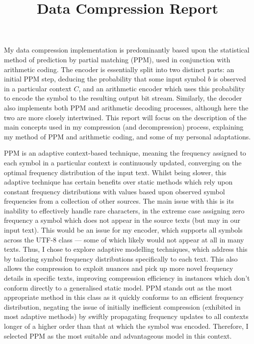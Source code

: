 \documentclass[a4paper, 11pt]{article}
\title{Data Compression Report}
\author{}
\date{}
\begin{document}
\maketitle

My data compression implementation is predominantly based upon the statistical method of prediction by partial matching (PPM), used in conjunction with arithmetic coding. The encoder is essentially split into two distinct parts: an initial PPM step, deducing the probability that some input symbol $b$ is observed in a particular context $C$, and an arithmetic encoder which uses this probability to encode the symbol to the resulting output bit stream. Similarly, the decoder also implements both PPM and arithmetic decoding processes, although here the two are more closely intertwined. This report will focus on the description of the main concepts used in my compression (and decompression) process, explaining my method of PPM and arithmetic coding, and some of my personal adaptations.

PPM is an adaptive context-based technique, meaning the frequency assigned to each symbol in a particular context is continuously updated, converging on the optimal frequency distribution of the input text. Whilst being slower, this adaptive technique has certain benefits over static methods which rely upon constant frequency distributions with values based upon observed symbol frequencies from a collection of other sources. The main issue with this is its inability to effectively handle rare characters, in the extreme case assigning zero frequency a symbol which does not appear in the source texts (but may in our input text). This would be an issue for my encoder, which supports all symbols across the UTF-8 class --- some of which likely would not appear at all in many texts. Thus, I chose to explore adaptive modelling techniques, which address this by tailoring symbol frequency distributions specifically to each text. This also allows the compression to exploit nuances and pick up more novel frequency details in specific texts, improving  compression efficiency in instances which don't conform directly to a generalised static model. PPM stands out as the most appropriate method in this class as it quickly conforms to an efficient frequency distribution, negating the issue of initially inefficient compression (exhibited in most adaptive methods) by swiftly propagating frequency updates to all contexts longer of a higher order than that at which the symbol was encoded. Therefore, I selected PPM as the most suitable and advantageous model in this context.
\end{document}
